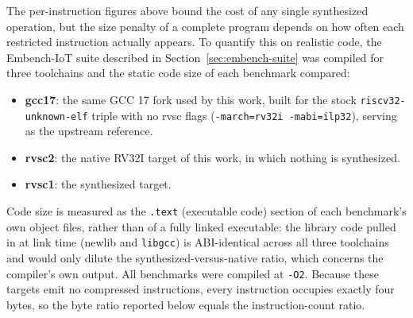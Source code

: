 The per-instruction figures above bound the cost of any single synthesized operation, but the size
penalty of a complete program depends on how often each restricted instruction actually appears. To
quantify this on realistic code, the Embench-IoT suite described in
Section~\ref{sec:embench-suite} was compiled for three toolchains and the static code size of each benchmark compared:

\begin{itemize}
  \item \textbf{gcc17}: the same GCC 17 fork used by this work, built for the stock
        \texttt{riscv32-unknown-elf} triple with no rvsc flags (\texttt{-march=rv32i -mabi=ilp32}),
        serving as the upstream reference.
  \item \textbf{rvsc2}: the native RV32I target of this work, in which nothing is synthesized.
  \item \textbf{rvsc1}: the synthesized target.
\end{itemize}

Code size is measured as the \texttt{.text} (executable code) section of each benchmark's own object
files, rather than of a fully linked executable: the library code pulled in at link time (newlib and
\texttt{libgcc}) is ABI-identical across all three toolchains and would only dilute the
synthesized-versus-native ratio, which concerns the compiler's own output. All benchmarks were
compiled at \texttt{-O2}. Because these targets emit no compressed instructions, every instruction
occupies exactly four bytes, so the byte ratio reported below equals the instruction-count ratio.

